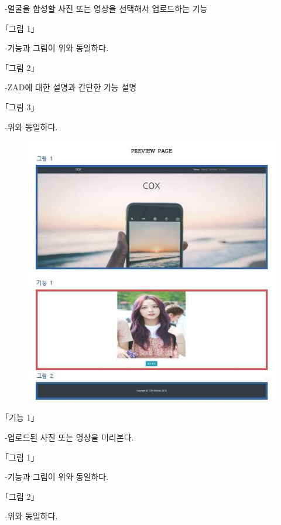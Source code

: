 \documentclass[chapter,oneside]{oblivoir}
\begin{document}
-얼굴을 합성할 사진 또는 영상을 선택해서 업로드하는 기능

｢그림 1｣

-기능과 그림이 위와 동일하다.

｢그림 2｣

-ZAD에 대한 설명과 간단한 기능 설명

｢그림 3｣

-위와 동일하다.

\newpage
\begin{figure}[h!]
    \centering
    \includegraphics{pic/chp6/img939}
\end{figure}

｢기능 1｣

-업로드된 사진 또는 영상을 미리본다.

｢그림 1｣

-기능과 그림이 위와 동일하다.

｢그림 2｣

-위와 동일하다.
\end{document}
